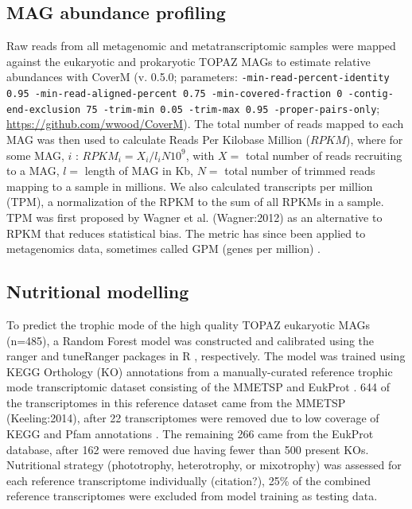\documentclass[12pt]{article}
\numberwithin{equation}{section}
\begin{document}
\subsection*{MAG abundance profiling} 

Raw reads from all metagenomic and metatranscriptomic samples were mapped against the eukaryotic and prokaryotic TOPAZ MAGs to estimate relative abundances with CoverM (v. 0.5.0; parameters: \texttt{-min-read-percent-identity 0.95 -min-read-aligned-percent 0.75  -min-covered-fraction 0 -contig-end-exclusion 75 -trim-min 0.05 -trim-max 0.95  -proper-pairs-only}; \url{https://github.com/wwood/CoverM}). The total number of reads mapped to each MAG was then used to calculate Reads Per Kilobase Million ($RPKM$), where for some MAG, $i$ :  $RPKM_i = {X_i}/{l_iN}10^9$, with $X =$ total number of reads recruiting to a MAG, $l =$ length of MAG in Kb, $N =$ total number of trimmed reads mapping to a sample in millions. We also calculated transcripts per million (TPM), a normalization of the RPKM to the sum of all RPKMs in a sample. TPM was first proposed by Wagner et al. (Wagner:2012) \citep{Wagner_2012} as an alternative to RPKM that reduces statistical bias. The metric has since been applied to metagenomics data, sometimes called GPM (genes per million) \citep{Gradoville_2017}. 

\subsection*{Nutritional modelling} 

To predict the trophic mode of the high quality TOPAZ eukaryotic MAGs (n=485), a Random Forest model \citep{Breiman_2001} was constructed and calibrated using the ranger \citep{Wright_2017} and tuneRanger packages in R \citep{tuneRanger}, respectively. The model was trained using KEGG Orthology (KO) annotations \citep{Kanehisa_2019} from a manually-curated reference trophic mode transcriptomic dataset consisting of the MMETSP \citep{Keeling2014} and EukProt \citep{Richter2020EukProt}. 644 of the transcriptomes in this reference dataset came from the MMETSP (Keeling:2014), after 22 transcriptomes were removed due to low coverage of KEGG and Pfam annotations \citep{Finn2014Pfam}. The remaining 266 came from the EukProt database, after 162 were removed due having fewer than 500 present KOs. Nutritional strategy (phototrophy, heterotrophy, or mixotrophy) was assessed for each reference transcriptome individually (citation?), 25\% of the combined reference transcriptomes were excluded from model training as testing data. 
\end{document}
